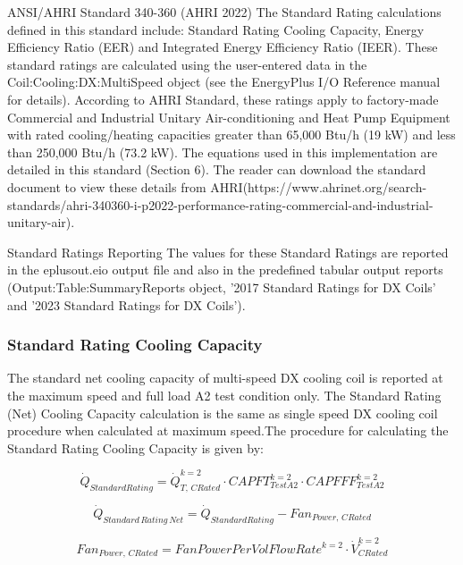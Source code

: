 ANSI/AHRI Standard 340-360 (AHRI 2022)
The Standard Rating calculations defined in this standard include: Standard Rating Cooling Capacity, Energy Efficiency Ratio (EER) and Integrated Energy Efficiency Ratio (IEER). These standard ratings are calculated using the user-entered data in the Coil:Cooling:DX:MultiSpeed object (see the EnergyPlus I/O Reference manual for details). According to AHRI Standard, these ratings apply to factory-made Commercial and Industrial Unitary Air-conditioning and Heat Pump Equipment with rated cooling/heating capacities greater than 65,000 Btu/h (19 kW) and less than 250,000 Btu/h (73.2 kW). The equations used in this implementation are detailed in this standard (Section 6). The reader can download the standard document to view these details from AHRI(https://www.ahrinet.org/search-standards/ahri-340360-i-p2022-performance-rating-commercial-and-industrial-unitary-air).

Standard Ratings Reporting
The values for these Standard Ratings are reported in the eplusout.eio output file and also in the predefined tabular output reports (Output:Table:SummaryReports object, '2017 Standard Ratings for DX Coils' and '2023 Standard Ratings for DX Coils').

\subsubsection{Standard Rating Cooling Capacity}\label{standard-rating-cooling-capacity}

The standard net cooling capacity of multi-speed DX cooling coil is reported at the maximum speed and full load A2 test condition only. The Standard Rating (Net) Cooling Capacity calculation is the same as single speed DX cooling coil procedure when calculated at maximum speed.The procedure for calculating the Standard Rating Cooling Capacity is given by:

\begin{equation}
{\dot Q_{StandardRating}} = \dot Q_{T,\,CRated}^{k = 2} \cdot CAPFT_{TestA2}^{k = 2} \cdot CAPFFF_{TestA2}^{k = 2}
\end{equation}

\begin{equation}
{\dot Q_{Standard\,Rating\,Net}} = {\dot Q_{StandardRating}} - Fa{n_{Power,\,CRated}}
\end{equation}

\begin{equation}
Fa{n_{Power,\,CRated}} = FanPowerPerVolFlowRat{e^{k = 2}} \cdot \dot V_{CRated}^{k = 2}
\end{equation}

